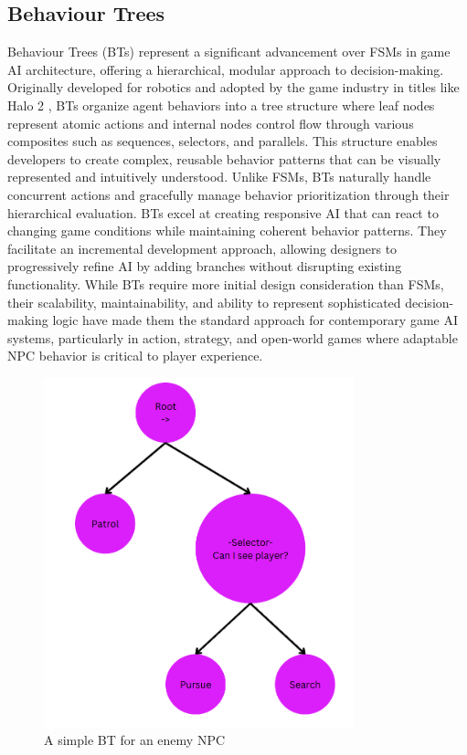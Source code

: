 \subsection{Behaviour Trees}

Behaviour Trees (BTs) represent a significant advancement over FSMs in game AI architecture, offering a hierarchical, modular approach to decision-making. 
Originally developed for robotics and adopted by the game industry in titles like Halo 2 \cite{simulacrum}, BTs organize agent behaviors into a tree structure where leaf nodes represent atomic actions and internal nodes control flow through various composites such as sequences, selectors, and parallels. 
This structure enables developers to create complex, reusable behavior patterns that can be visually represented and intuitively understood. 
Unlike FSMs, BTs naturally handle concurrent actions and gracefully manage behavior prioritization through their hierarchical evaluation.
BTs excel at creating responsive AI that can react to changing game conditions while maintaining coherent behavior patterns. 
They facilitate an incremental development approach, allowing designers to progressively refine AI by adding branches without disrupting existing functionality.
While BTs require more initial design consideration than FSMs, their scalability, maintainability, and ability to represent sophisticated decision-making logic have made them the standard approach for contemporary game AI systems, particularly in action, strategy, and open-world games where adaptable NPC behavior is critical to player experience.

\begin{figure}[H]
    \centering
    \includegraphics[width=0.8\textwidth]{figures/bt.png}
    \caption{A simple BT for an enemy NPC}
    \label{fig:bt}
\end{figure}

